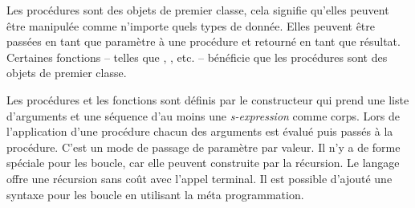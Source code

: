 Les procédures sont des objets de premier classe, cela signifie qu'elles
peuvent être manipulée comme n'importe quels types de donnée. Elles peuvent
être passées en tant que paramètre à une procédure et retourné en tant que
résultat.  Certaines fonctions -- telles que , , etc.
-- bénéficie que les procédures sont des objets de premier classe.

Les procédures et les fonctions sont définis par le constructeur
 qui prend une liste d'arguments et une séquence d'au moins une
\textit{s-expression} comme corps. Lors de l'application d'une procédure chacun
des arguments est évalué puis passés à la procédure. C'est un mode de passage
de paramètre par valeur. Il n'y a de forme spéciale pour les boucle, car elle
peuvent construite par la récursion. Le langage offre une récursion sans coût
avec l'appel terminal.  Il est possible d'ajouté une syntaxe pour les boucle en
utilisant la méta programmation.






